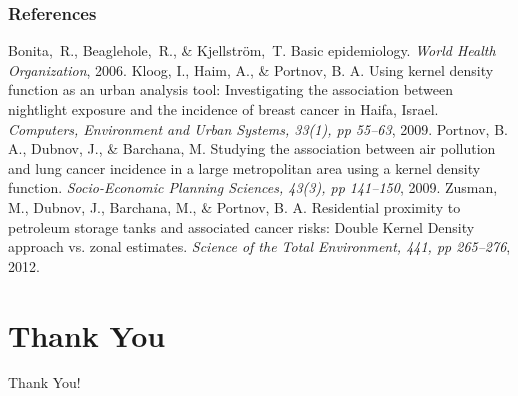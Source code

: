 \documentclass[notheorems]{beamer}
\theoremstyle{definition}
\theoremstyle{example}
\begin{document}
\begin{frame}\frametitle{References}
    \footnotesize
    \begin{thebibliography}{10}
            Bonita,~R., Beaglehole,~R., \& Kjellstr{\" o}m,~T.
            Basic epidemiology.
            {\em World Health Organization}, 2006.
            Kloog, I., Haim, A., \& Portnov, B. A.
            Using kernel density function as an urban analysis tool: Investigating the association between nightlight exposure and the incidence of breast cancer in Haifa, Israel.
            {\em Computers, Environment and Urban Systems, 33(1), pp 55--63}, 2009.
            Portnov, B. A., Dubnov, J., \& Barchana, M.
            Studying the association between air pollution and lung cancer incidence in a large metropolitan area using a kernel density function.
            {\em Socio-Economic Planning Sciences, 43(3), pp 141--150}, 2009.
            Zusman, M., Dubnov, J., Barchana, M., \& Portnov, B. A.
            Residential proximity to petroleum storage tanks and associated cancer risks: Double Kernel Density approach vs. zonal estimates.
            {\em Science of the Total Environment, 441, pp 265--276}, 2012.
    \end{thebibliography}
\end{frame}

\section{Thank You}

\begin{frame}
    \begin{center}
        {
            \color{orange}
            \fontsize{40}{50}\selectfont Thank You!
        }
    \end{center}
\end{frame}
\end{document}
